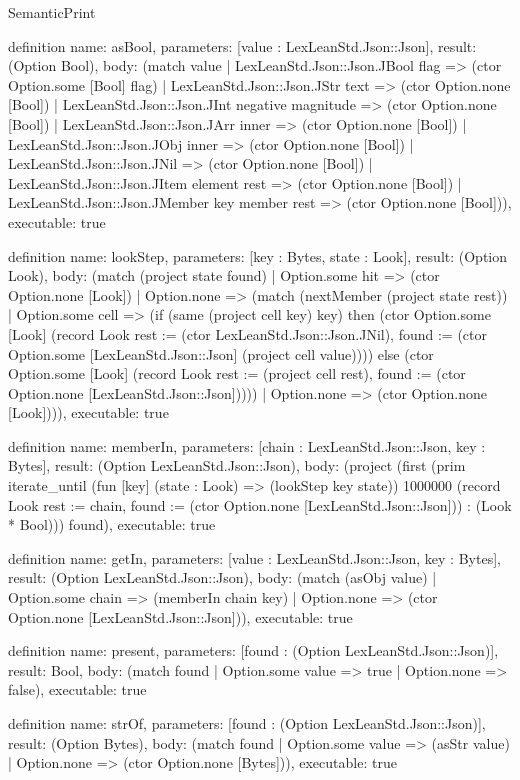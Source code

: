 \begin{lexlean}{SemanticPrint}
\begin{semanticmodule}
definition{
  name: asBool,
  parameters: [value : LexLeanStd.Json::Json],
  result: (Option Bool),
  body: (match value
    | LexLeanStd.Json::Json.JBool flag => (ctor Option.some [Bool] flag)
    | LexLeanStd.Json::Json.JStr text => (ctor Option.none [Bool])
    | LexLeanStd.Json::Json.JInt negative magnitude => (ctor Option.none [Bool])
    | LexLeanStd.Json::Json.JArr inner => (ctor Option.none [Bool])
    | LexLeanStd.Json::Json.JObj inner => (ctor Option.none [Bool])
    | LexLeanStd.Json::Json.JNil => (ctor Option.none [Bool])
    | LexLeanStd.Json::Json.JItem element rest => (ctor Option.none [Bool])
    | LexLeanStd.Json::Json.JMember key member rest => (ctor Option.none [Bool])),
  executable: true
}

definition{
  name: lookStep,
  parameters: [key : Bytes, state : Look],
  result: (Option Look),
  body: (match (project state found)
    | Option.some hit => (ctor Option.none [Look])
    | Option.none => (match (nextMember (project state rest))
      | Option.some cell => (if (same (project cell key) key) then (ctor Option.some [Look] (record Look {rest := (ctor LexLeanStd.Json::Json.JNil), found := (ctor Option.some [LexLeanStd.Json::Json] (project cell value))})) else (ctor Option.some [Look] (record Look {rest := (project cell rest), found := (ctor Option.none [LexLeanStd.Json::Json])})))
      | Option.none => (ctor Option.none [Look]))),
  executable: true
}

definition{
  name: memberIn,
  parameters: [chain : LexLeanStd.Json::Json, key : Bytes],
  result: (Option LexLeanStd.Json::Json),
  body: (project (first (prim iterate_until (fun [key] (state : Look) => (lookStep key state)) 1000000 (record Look {rest := chain, found := (ctor Option.none [LexLeanStd.Json::Json])}) : (Look * Bool))) found),
  executable: true
}

definition{
  name: getIn,
  parameters: [value : LexLeanStd.Json::Json, key : Bytes],
  result: (Option LexLeanStd.Json::Json),
  body: (match (asObj value)
    | Option.some chain => (memberIn chain key)
    | Option.none => (ctor Option.none [LexLeanStd.Json::Json])),
  executable: true
}

definition{
  name: present,
  parameters: [found : (Option LexLeanStd.Json::Json)],
  result: Bool,
  body: (match found | Option.some value => true | Option.none => false),
  executable: true
}

definition{
  name: strOf,
  parameters: [found : (Option LexLeanStd.Json::Json)],
  result: (Option Bytes),
  body: (match found
    | Option.some value => (asStr value)
    | Option.none => (ctor Option.none [Bytes])),
  executable: true
}


\end{semanticmodule}
\end{lexlean}
